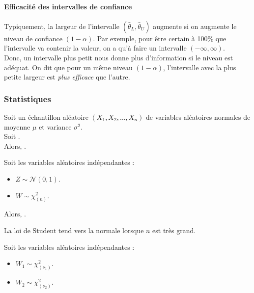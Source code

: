 \documentclass[10pt, french]{article}
\begin{document}
\begin{multicols*}{2}
\paragraph{Efficacité des intervalles de confiance}
Typiquement, la largeur de l'intervalle $(\hat{\theta}_{L}, \hat{\theta}_{U})$ augmente si on augmente le niveau de confiance $(1 - \alpha)$. Par exemple, pour être certain à 100\% que l'intervalle va contenir la valeur, on a qu'à faire un intervalle $(-\infty, \infty)$.\\

Donc, un intervalle plus petit nous donne plus d'information si le niveau est adéquat. On dit que pour un même niveau $(1 - \alpha)$, l'intervalle avec la plus petite largeur est \textit{plus efficace} que l'autre.

\subsubsection{Statistiques}
\begin{rappel_enhanced}
Soit un échantillon aléatoire $(X_{1}, X_{2}, \dots, X_{n})$ de variables aléatoires normales de moyenne $\mu$ et variance $\sigma^{2}$.\\
Soit .\\

Alors, .
\end{rappel_enhanced}

\begin{rappel_enhanced}
Soit les variables aléatoires indépendantes :
\begin{itemize}
	\item	$Z \sim \mathcal{N}(0, 1)$.
	\item	$W \sim \chi^{2}_{(n)}$.
\end{itemize}

Alors, .\\

\tcbline

La loi de Student tend vers la normale lorsque $n$ est très grand.
\end{rappel_enhanced}

\begin{rappel_enhanced}
Soit les variables aléatoires indépendantes :
\begin{itemize}
	\item	$W_{1} \sim \chi^{2}_{(\nu_{1})}$.
	\item	$W_{2} \sim \chi^{2}_{(\nu_{2})}$.
\end{itemize}


\end{rappel_enhanced}
\end{multicols*}
\end{document}

